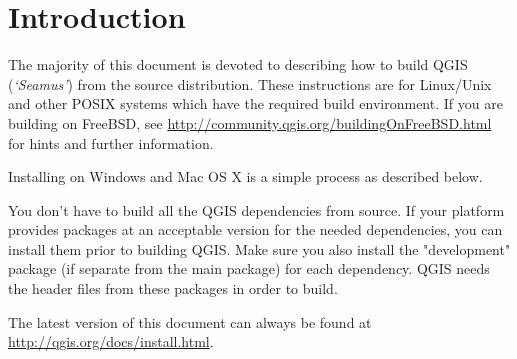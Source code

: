 
\section{Introduction}\label{label_introduction}
\setcounter{page}{1}

The majority of this document is devoted to describing how to build
QGIS~\CURRENT
(\textit{`Seamus'}) from the source distribution. These instructions are for
Linux/Unix and other POSIX systems which have the required build
environment. If you are building on FreeBSD, see
\url{http://community.qgis.org/buildingOnFreeBSD.html} for hints and further
information.

Installing on Windows and Mac OS X is a simple process as described
below.

You don't have to build all the QGIS dependencies from source. If your
platform provides packages at an acceptable version for the needed
dependencies, you can install them prior to building QGIS. Make sure you
also install the "development" package (if separate from the main package)
for each dependency. QGIS needs the header files from these packages in
order to build. 

The latest version of this document can always be found at 
\url{http://qgis.org/docs/install.html}.
